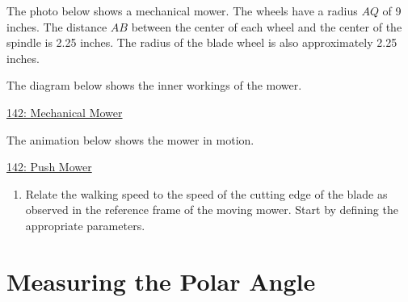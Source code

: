 \documentclass{ximera}
\begin{document}
\begin{question}    \label{Q850:Angles}
The photo below shows a mechanical mower. The wheels have a radius $AQ$ of 9 inches. The distance $AB$ between the center of each wheel and the center of the spindle is 2.25 inches. The radius of the blade wheel is also approximately 2.25 inches.

 
\begin{onlineOnly}
    \begin{center}
\end{center}
\end{onlineOnly}

The diagram below shows the inner workings of the mower.
\begin{onlineOnly}
\begin{center}
\end{center}
\end{onlineOnly}

\href{https://www.desmos.com/calculator/lsxarkvo6r}{142: Mechanical Mower}

The animation below shows the  mower in motion.

\begin{onlineOnly}
\begin{center}
\end{center}
\end{onlineOnly}

\href{https://www.desmos.com/calculator/3yjpzc2s1s}{142: Push Mower}



\begin{enumerate}
\item Relate the walking speed to the speed of the cutting edge of the blade as observed in the reference frame of the moving mower. Start by defining the appropriate parameters.
\end{enumerate}

\end{question}






\section{Measuring the Polar Angle}
\end{document}
